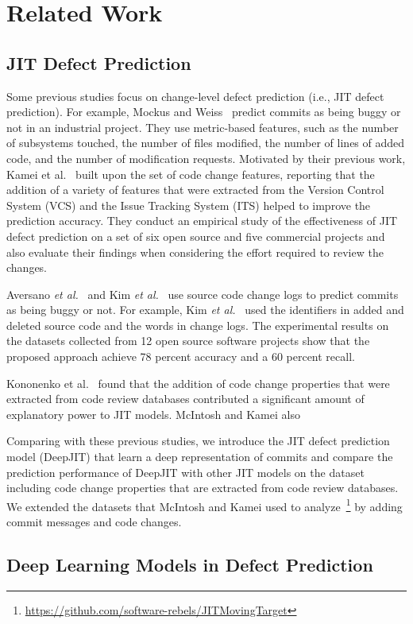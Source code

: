 \section{Related Work}
\label{sec:related}
\subsection{JIT Defect Prediction}
Some previous studies focus on change-level defect prediction (i.e., JIT defect prediction). For example, Mockus and Weiss~\cite{Mockus2000} predict commits as being buggy or not in an industrial project. They use metric-based features, such as the number of subsystems touched, the number of files modified, the number of lines of added code, and the number of modification requests. Motivated by their previous work, Kamei et al.~\cite{Kamei:2013:LES} built upon the set of code change features, reporting that the addition of a variety of features that were extracted from the Version Control System (VCS) and the Issue Tracking System (ITS) helped to improve the prediction accuracy. They conduct an empirical study of the effectiveness of JIT defect prediction on a set of six open source and five commercial projects and also evaluate their findings when considering the effort required to review the changes.

Aversano \emph{et al.}~\cite{Aversano2007} and Kim \emph{et al.}~\cite{Kim2008} use source code change logs to predict commits as being buggy or not. For example, Kim \emph{et al.}~\cite{Kim2008} used the identifiers in added and deleted source code and the words in change logs. The experimental results on the datasets collected from 12 open source software projects show that the proposed approach achieve 78 percent accuracy and a 60 percent recall.

Kononenko et al.~\cite{Kononenko:2015} found that the addition of code change properties that were extracted from code review databases contributed a significant amount of explanatory power to JIT models. McIntosh and Kamei also 

Comparing with these previous studies, we introduce the JIT defect prediction model (DeepJIT) that learn a deep representation of commits and compare the prediction performance of DeepJIT with other JIT models on the dataset including code change properties that are extracted from code review databases. We extended the datasets that McIntosh and Kamei used to analyze~\footnote{\url{https://github.com/software-rebels/JITMovingTarget}} by adding commit messages and code changes. 

\subsection{Deep Learning Models in Defect Prediction}



